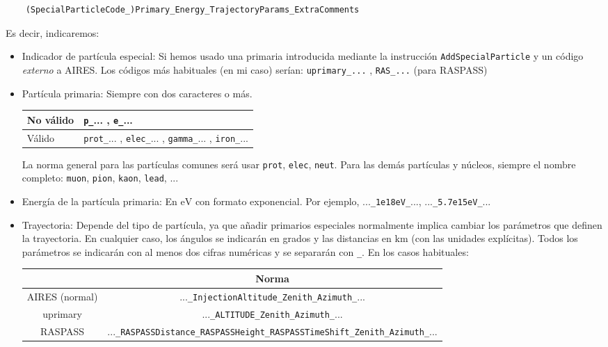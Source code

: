 \documentclass[a4paper,12pt]{article}
\numberwithin{equation}{section}
\numberwithin{figure}{section}
\begin{document}
\begin{verbatim}
	(SpecialParticleCode_)Primary_Energy_TrajectoryParams_ExtraComments
\end{verbatim}
Es decir, indicaremos:
\begin{itemize}
	\item Indicador de partícula especial: Si hemos usado una primaria introducida mediante la instrucción \verb|AddSpecialParticle| y un código \textit{externo} a AIRES. Los códigos más habituales (en mi caso) serían:
	\verb|uprimary_...| , \verb|RAS_...| (para RASPASS)
	\item Partícula primaria: Siempre con dos caracteres o más.
\begin{table}[H]
	\centering
	\begin{tabular}{|l|l|}
		\hline
		No válido &\verb|p_|... , \verb|e_|...                                              \\ \hline
		Válido    & \verb|prot_|...   ,    \verb|elec_|...   ,   \verb|gamma_|...   ,    \verb|iron_|... \\ \hline
	\end{tabular}
\end{table}

La norma general para las partículas comunes será usar \verb|prot|, \verb|elec|, \verb|neut|. Para las demás partículas y núcleos, siempre el nombre completo: \verb|muon|, \verb|pion|, \verb|kaon|, \verb|lead|, ...

\item Energía de la partícula primaria: En $\mathrm{eV}$ con formato exponencial. Por ejemplo, ...\verb|_1e18eV_|..., ...\verb|_5.7e15eV_|... 
\item Trayectoria: Depende del tipo de partícula, ya que añadir primarios especiales normalmente implica cambiar los parámetros que definen la trayectoria. En cualquier caso, los ángulos se indicarán en grados y las distancias en $\mathrm{km}$ (con las unidades explícitas). Todos los parámetros se indicarán con  al menos dos cifras numéricas y se separarán con \verb|_|. En los casos habituales:

\begin{table}[H]
	\centering
	\begin{tabular}{c|c|}
		\cline{2-2}
		\multicolumn{1}{l|}{}                & Norma                                                                     \\ \hline
		\multicolumn{1}{|c|}{AIRES (normal)} & ...\verb|_InjectionAltitude_Zenith_Azimuth_|...                                \\ \hline
		\multicolumn{1}{|c|}{uprimary}       & ...\verb|_ALTITUDE_Zenith_Azimuth_|...                                         \\ \hline
		\multicolumn{1}{|c|}{RASPASS}        & ...\verb|_RASPASSDistance_RASPASSHeight_RASPASSTimeShift_Zenith_Azimuth_|... \\ \hline
	\end{tabular}
\end{table}


\end{itemize}
\end{document}
